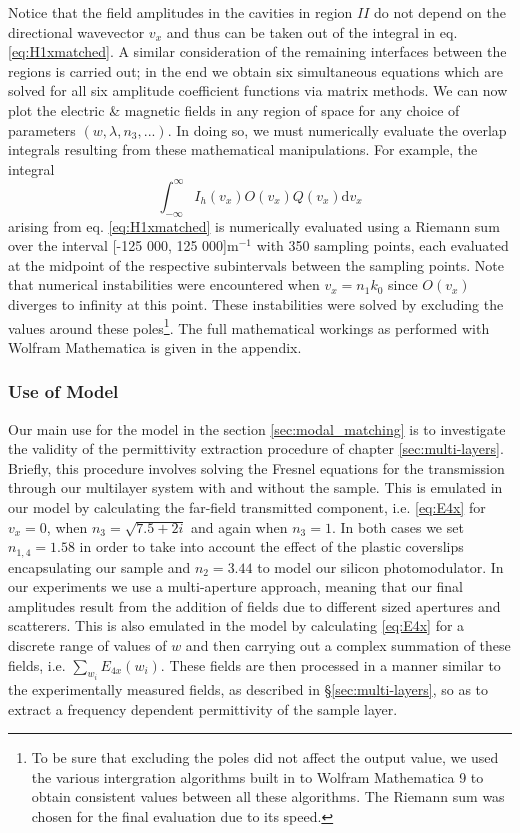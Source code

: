 Notice that the field amplitudes in the cavities in region $II$ do not depend on the directional wavevector $v_x$ and thus can be taken out of the integral in eq. \eqref{eq:H1xmatched}. A similar consideration of the remaining interfaces between the regions is carried out; in the end we obtain six simultaneous equations which are solved for all six amplitude coefficient functions via matrix methods. We can now plot the electric \& magnetic fields in any region of space for any choice of parameters $(w,\lambda, n_3,...)$. In doing so, we must numerically evaluate the overlap integrals resulting from these mathematical manipulations. For example, the integral
\begin{equation} %
\int_{-\infty}^{\infty}  I_h(v_x) O(v_x) Q(v_x)    \text{d}v_x
\label{eq:overlap}
\end{equation}
arising from eq. \eqref{eq:H1xmatched} is numerically evaluated using a Riemann sum over the interval [-125 000, 125 000]m$^{-1}$ with 350 sampling points, each evaluated at the midpoint of the respective subintervals between the sampling points. Note that numerical instabilities were encountered when $v_x=n_1k_0$ since $O(v_x)$ diverges to infinity at this point. These instabilities were solved by excluding the values around these poles\footnote{To be sure that excluding the poles did not affect the output value, we used the various intergration algorithms built in to Wolfram Mathematica 9 to obtain consistent values between all these algorithms. The Riemann sum was chosen for the final evaluation due to its speed.}. The full mathematical workings as performed with Wolfram Mathematica is given in the appendix. 


\subsubsection*{Use of Model}
Our main use for the model in the section \ref{sec:modal_matching} is to investigate the validity of the permittivity extraction procedure of chapter \ref{sec:multi-layers}. Briefly, this procedure involves solving the Fresnel equations for the transmission through our multilayer system with and without the sample. This is emulated in our model by calculating the far-field transmitted component, i.e. \eqref{eq:E4x} for $v_x=0$, when $n_3=\sqrt{7.5+2i}$ and again when $n_3=1$. In both cases we set $n_{1,4}=1.58$ in order to take into account the effect of the plastic coverslips encapsulating our sample and $n_2=3.44$ to model our silicon photomodulator. In our experiments we use a multi-aperture approach, meaning that our final amplitudes result from the addition of fields due to different sized apertures and scatterers. This is also emulated in the model by calculating \eqref{eq:E4x} for a discrete range of values of $w$ and then carrying out a  complex summation of these fields, i.e. $\sum_{w_i} E_{4x}(w_i)$. These fields are then processed in a manner similar to the experimentally measured fields, as described in \S\ref{sec:multi-layers}, so as to extract a frequency dependent permittivity of the sample layer. 


